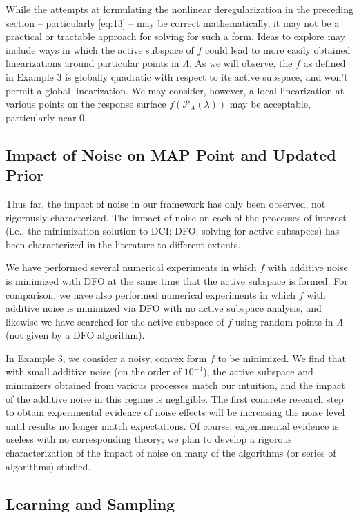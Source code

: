 \documentclass{amsart}
\begin{document}
While the attempts at formulating the nonlinear deregularization in the preceding section -- particularly \eqref{eq:13} -- may be correct mathematically, it may not be a practical or tractable approach for solving for such a form. Ideas to explore may include ways in which the active subspace of $f$ could lead to more easily obtained linearizations around particular points in $\Lambda$. As we will observe, the $f$ as defined in Example 3 is globally quadratic with respect to its active subspace, and won't permit a global linearization. We may consider, however, a local linearization at various points on the response surface $f(\mathcal{P}_A(\lambda))$ may be acceptable, particularly near 0.


\subsection{Impact of Noise on MAP Point and Updated Prior}

Thus far, the impact of noise in our framework has only been observed, not rigorously characterized. The impact of noise on each of the processes of interest (i.e., the minimization solution to DCI; DFO; solving for active subsapces) has been characterized in the literature to different extents. 

We have performed several numerical experiments in which $f$ with additive noise is minimized with DFO at the same time that the active subspace is formed. For comparison, we have also performed numerical experiments in which $f$ with additive noise is minimized via DFO with no active subspace analysis, and likewise we have searched for the active subspace of $f$ using random points in $\Lambda$ (not given by a DFO algorithm).

In Example 3, we consider a noisy, convex form $f$ to be minimized. We find that with small additive noise (on the order of $10^{-4}$), the active subspace and minimizers obtained from various processes match our intuition, and the impact of the additive noise in this regime is negligible. The first concrete research step to obtain experimental evidence of noise effects will be increasing the noise level until results no longer match expectations. Of course, experimental evidence is useless with no corresponding theory; we plan to develop a rigorous characterization of the impact of noise on many of the algorithms (or series of algorithms) studied.



\subsection{Learning and Sampling}
\end{document}
